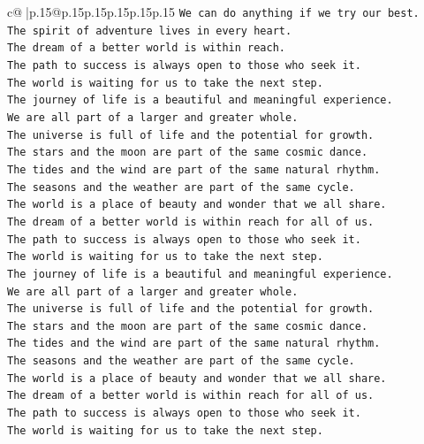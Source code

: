 \documentclass{article}
\begin{document}
{\begin{supertabular}{c@{$\;$}|p{.15\linewidth}@{}p{.15\linewidth}p{.15\linewidth}p{.15\linewidth}p{.15\linewidth}p{.15\linewidth}}
{{{\texttt{We can do anything if we try our best.} \\
\texttt{The spirit of adventure lives in every heart.} \\
\texttt{The dream of a better world is within reach.} \\
\texttt{The path to success is always open to those who seek it.} \\
\texttt{The world is waiting for us to take the next step.} \\
\texttt{The journey of life is a beautiful and meaningful experience.} \\
\texttt{We are all part of a larger and greater whole.} \\
\texttt{The universe is full of life and the potential for growth.} \\
\texttt{The stars and the moon are part of the same cosmic dance.} \\
\texttt{The tides and the wind are part of the same natural rhythm.} \\
\texttt{The seasons and the weather are part of the same cycle.} \\
\texttt{The world is a place of beauty and wonder that we all share.} \\
\texttt{The dream of a better world is within reach for all of us.} \\
\texttt{The path to success is always open to those who seek it.} \\
\texttt{The world is waiting for us to take the next step.} \\
\texttt{The journey of life is a beautiful and meaningful experience.} \\
\texttt{We are all part of a larger and greater whole.} \\
\texttt{The universe is full of life and the potential for growth.} \\
\texttt{The stars and the moon are part of the same cosmic dance.} \\
\texttt{The tides and the wind are part of the same natural rhythm.} \\
\texttt{The seasons and the weather are part of the same cycle.} \\
\texttt{The world is a place of beauty and wonder that we all share.} \\
\texttt{The dream of a better world is within reach for all of us.} \\
\texttt{The path to success is always open to those who seek it.} \\
\texttt{The world is waiting for us to take the next step.} \\
}}}
\end{supertabular}}
\end{document}
